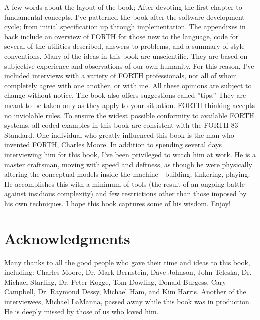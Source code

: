 A few words about the layout of the book; After devoting the first
chapter to fundamental concepts, I've patterned the book after the
software development cycle; from initial specification up through
implementation. The appendixes in back include an overview of FORTH
for those new to the language, code for several of the utilities described,
answers to problems, and a summary of style conventions. Many of the
ideas in this book are unscientific. They are based on subjective
experience and observations of our own humanity. For this reason,
I've included interviews with a variety of FORTH professionals, not
all of whom completely agree with one another, or with me. All these
opinions are subject to change without notice. The book also offers
suggestions called ''tips.'' They are meant to be taken only as they
apply to your situation. FORTH thinking accepts no inviolable rules.
To ensure the widest possible conformity to available FORTH systems,
all coded examples in this book are consistent with the FORTH-83 Standard.
One individual who greatly influenced this book is the man who invented
FORTH, Charles Moore. In addition to spending several days interviewing
him for this book, I've been privileged to watch him at work. He is
a master craftsman, moving with speed and deftness, as though he were
physically altering the conceptual models inside the machine---building,
tinkering, playing. He accomplishes this with a minimum of tools (the
result of an ongoing battle against insidious complexity) and few
restrictions other than those imposed by his own techniques. I hope
this book captures some of his wisdom. Enjoy!


\section*{Acknowledgments}

Many thanks to all the good people who gave their time and ideas to
this book, including: Charles Moore, Dr. Mark Bernstein, Dave Johnson,
John Teleska, Dr. Michael Starling, Dr. Peter Kogge, Tom Dowling,
Donald Burgess, Cary Campbell, Dr. Raymond Dessy, Michael Ham, and
Kim Harris. Another of the interviewees, Michael LaManna, passed away
while this book was in production. He is deeply missed by those of
us who loved him. 

